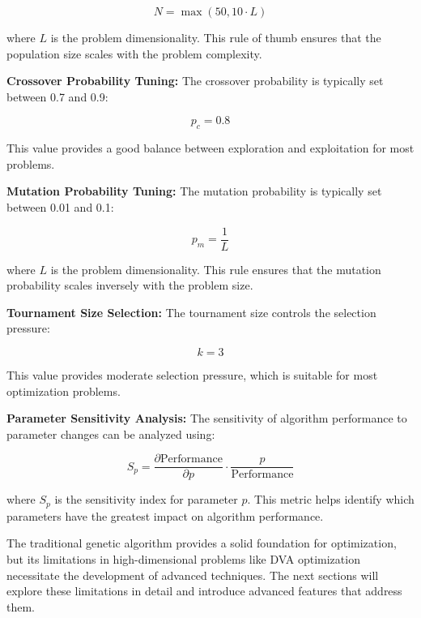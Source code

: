 \documentclass[12pt,a4paper]{article}
\begin{document}
\begin{equation}\label{Eq.population_size_selection}
N = \max(50, 10 \cdot L)
\end{equation}

where $L$ is the problem dimensionality. This rule of thumb ensures that the population size scales with the problem complexity.

\textbf{Crossover Probability Tuning:} The crossover probability is typically set between 0.7 and 0.9:

\begin{equation}\label{Eq.crossover_probability_tuning}
p_c = 0.8
\end{equation}

This value provides a good balance between exploration and exploitation for most problems.

\textbf{Mutation Probability Tuning:} The mutation probability is typically set between 0.01 and 0.1:

\begin{equation}\label{Eq.mutation_probability_tuning}
p_m = \frac{1}{L}
\end{equation}

where $L$ is the problem dimensionality. This rule ensures that the mutation probability scales inversely with the problem size.

\textbf{Tournament Size Selection:} The tournament size controls the selection pressure:

\begin{equation}\label{Eq.tournament_size_selection}
k = 3
\end{equation}

This value provides moderate selection pressure, which is suitable for most optimization problems.

\textbf{Parameter Sensitivity Analysis:} The sensitivity of algorithm performance to parameter changes can be analyzed using:

\begin{equation}\label{Eq.parameter_sensitivity}
S_p = \frac{\partial \text{Performance}}{\partial p} \cdot \frac{p}{\text{Performance}}
\end{equation}

where $S_p$ is the sensitivity index for parameter $p$. This metric helps identify which parameters have the greatest impact on algorithm performance.

The traditional genetic algorithm provides a solid foundation for optimization, but its limitations in high-dimensional problems like DVA optimization necessitate the development of advanced techniques. The next sections will explore these limitations in detail and introduce advanced features that address them.
\end{document}
